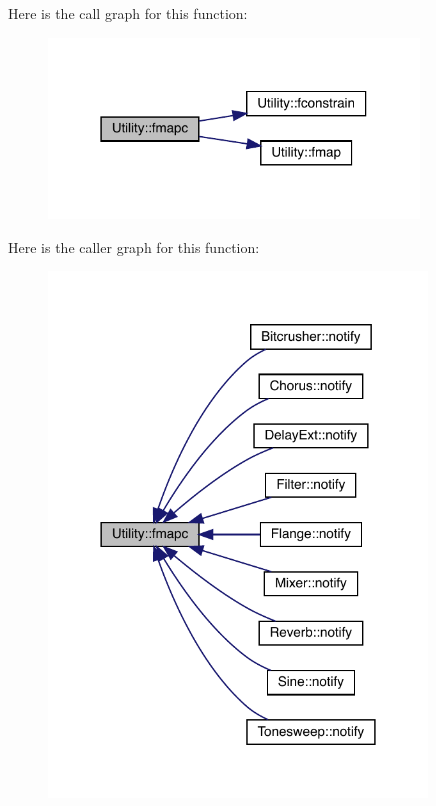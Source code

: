 Here is the call graph for this function\+:\nopagebreak
\begin{figure}[H]
\begin{center}
\leavevmode
\includegraphics[width=279pt]{class_utility_abee51df02bf586bd7d6bc36481152402_cgraph}
\end{center}
\end{figure}
Here is the caller graph for this function\+:\nopagebreak
\begin{figure}[H]
\begin{center}
\leavevmode
\includegraphics[width=285pt]{class_utility_abee51df02bf586bd7d6bc36481152402_icgraph}
\end{center}
\end{figure}
\mbox{\label{class_utility_a46bd6f349ac360fa663dce98a102c805}} 
